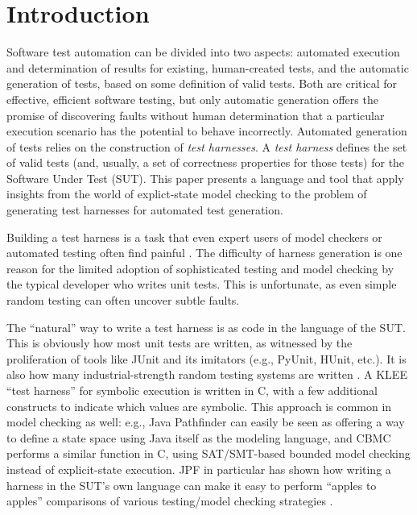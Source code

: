 \section{Introduction}

Software test automation can be divided into two aspects:  automated execution
and determination of results for existing, human-created tests, and
the automatic generation of tests, based on some definition of valid
tests.  Both are critical for effective, efficient software testing,
but only automatic generation offers the promise of discovering faults
without human determination that a particular execution scenario has
the potential to behave incorrectly.  Automated generation of tests
relies on the construction of \emph{test harnesses}.  A \emph{test harness} defines the
set of valid tests (and, usually, a set of correctness properties for
those tests) for the Software Under Test (SUT).
This paper presents a language and tool that apply insights from the
world of explict-state model checking to the problem of generating
test harnesses for automated test generation.  

Building a test harness is a task that even expert users of model
checkers or automated testing often find painful
\cite{woda08,woda12}.  The difficulty of harness generation is one
reason for the limited adoption of sophisticated testing and model
checking by the typical developer who writes unit tests.  This is
unfortunate, as even simple random testing can often uncover subtle
faults.

The ``natural'' way to write a test harness is as code in the language
of the SUT.  This is obviously how most unit
tests are written, as witnessed by the proliferation of tools like
JUnit \cite{JUnit} and its imitators (e.g., PyUnit, HUnit, etc.).  It
is also how many industrial-strength random testing systems are
written \cite{ICSEDiff,AMAI}.  A KLEE ``test harness'' \cite{KLEE} for
symbolic execution is written in C, with a few additional constructs
to indicate which values are symbolic.  This approach is common in
model checking as well: e.g., Java Pathfinder \cite{JPF,JPF2} can
easily be seen as offering a way to define a state space using Java
itself as the modeling language, and CBMC \cite{CBMC,CBMCp} performs a
similar function in C, using SAT/SMT-based bounded model checking
instead of explicit-state execution.  JPF in particular has shown how
writing a harness in the SUT's own language can make it easy to
perform ``apples to apples'' comparisons of various testing/model
checking strategies \cite{JPFRandTest}.


